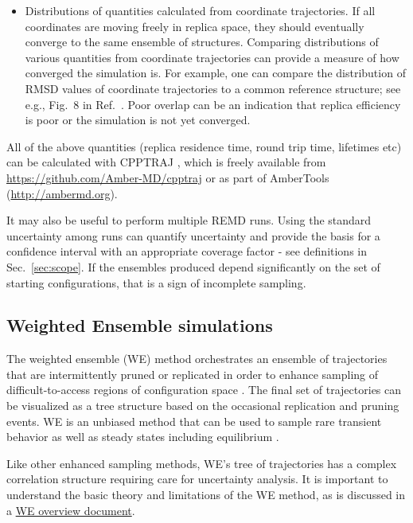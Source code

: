 \begin{itemize}
  \item Distributions of quantities calculated from coordinate trajectories. If all coordinates are moving freely in replica space, they should eventually converge to the same ensemble of structures. Comparing distributions of various quantities from coordinate trajectories can provide a measure of how converged the simulation is. For example, one can compare the distribution of RMSD values of coordinate trajectories to a common reference structure; see e.g., Fig.\ 8 in Ref.\ \citep{Henriksen2013}. Poor overlap can be an indication that replica efficiency is poor or the simulation is not yet converged.
\end{itemize}

All of the above quantities (replica residence time, round trip time, lifetimes etc) can be calculated with CPPTRAJ \citep{Roe2013}, which is freely available from \url{https://github.com/Amber-MD/cpptraj} or as part of AmberTools (\url{http://ambermd.org}).

It may also be useful to perform multiple REMD runs.  Using the standard uncertainty among runs can quantify uncertainty and provide the basis for a confidence interval with an appropriate coverage factor - see definitions in Sec.\ \ref{sec:scope}.  If the ensembles produced depend significantly on the set of starting configurations, that is a sign of incomplete sampling.

\subsection{Weighted Ensemble simulations}

The weighted ensemble (WE) method orchestrates an ensemble of trajectories that are intermittently pruned or replicated in order to enhance sampling of difficult-to-access regions of configuration space \cite{Huber-1996}.
The final set of trajectories can be visualized as a tree structure based on the occasional replication and pruning events.
WE is an unbiased method that can be used to sample rare transient behavior \cite{Zhang2010a} as well as steady states \cite{Bhatt2010a} including equilibrium \cite{Suarez2014}.

Like other enhanced sampling methods, WE's tree of trajectories has a complex correlation structure requiring care for uncertainty analysis.
It is important to understand the basic theory and limitations of the WE method, as is discussed in a
\href{https://westpa.github.io/westpa/overview.html}{WE overview document}.

